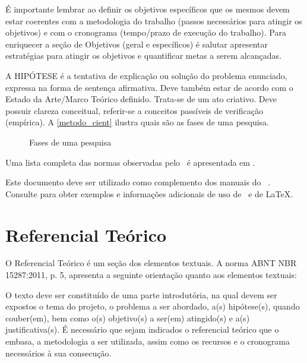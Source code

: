 \documentclass[
12pt,				%
openright,			%
oneside,
a4paper,			%
english,			%
french,				%
spanish,			%
brazil,				%
]{abntex2}
\begin{document}
	É importante lembrar ao definir os objetivos específicos que os mesmos devem estar coerentes com a metodologia do trabalho (passos necessários para atingir os objetivos) e com o cronograma (tempo/prazo de execução do trabalho).
	Para enriquecer a seção de Objetivos (geral e específicos) é salutar apresentar estratégias para atingir os objetivos e quantificar metas a serem alcançadas.
	
	A HIPÓTESE é a tentativa de explicação ou solução do problema enunciado, expressa na forma de sentença afirmativa. Deve também estar de acordo com o Estado da Arte/Marco Teórico definido. Trata-se de um ato criativo. Deve possuir clareza conceitual, referir-se a conceitos passíveis de verificação (empírica). A \autoref{metodo_cient} ilustra quais são as fases de uma pesquisa.
	
	\begin{figure}[!htb]
		\centering
		\caption{Fases de uma pesquisa}
		\label{metodo_cient}
	\end{figure}
	
	Uma lista completa das normas
	observadas pelo \abnTeX\ é apresentada em .
	
	
	
	Este documento deve ser utilizado como complemento dos manuais do \abnTeX\ 
	\cite{abntex2classe,abntex2cite,abntex2cite-alf}. Consulte  para obter
	exemplos e informações adicionais de uso de \abnTeX\ e de \LaTeX.
	
	
	
	
	
	
	\chapter{Referencial Teórico}
	
	 O Referencial Teórico é um seção dos elementos textuais. A norma ABNT NBR 15287:2011, p. 5, apresenta a
	seguinte orientação quanto aos elementos textuais:
	
	\begin{citacao}
		O texto deve ser constituído de uma parte introdutória, na qual devem ser
		expostos o tema do projeto, o problema a ser abordado, a(s) hipótese(s),
		quando couber(em), bem como o(s) objetivo(s) a ser(em) atingido(s) e a(s)
		justificativa(s). É necessário que sejam indicados o referencial teórico que
		o embasa, a metodologia a ser utilizada, assim como os recursos e o cronograma
		necessários à sua consecução.\citeonline{abntex2classe}
	\end{citacao}
	
\end{document}
